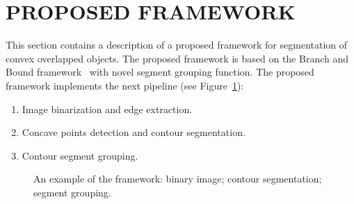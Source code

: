 \documentclass{lutmscthesis}[2010/09/22]
\begin{document}
\section{PROPOSED FRAMEWORK}
\label{sec:proposed}

This section contains a description of a proposed framework for segmentation of convex overlapped objects.
The proposed framework is based on the Branch and Bound framework~\cite{zafari-bb} with novel segment grouping function. The proposed framework implements the next pipeline (see Figure~\ref{fig:pipeline}):

\begin{enumerate}
    \item Image binarization and edge extraction.
    \item Concave points detection and contour segmentation.
    \item Contour segment grouping.
\end{enumerate}


\begin{figure}[ht]
    \centering
    
    
    \caption[]{
        An example of the framework:
         binary image;
         contour segmentation;
         segment grouping.
    }
    \label{fig:pipeline}
\end{figure}
\end{document}
